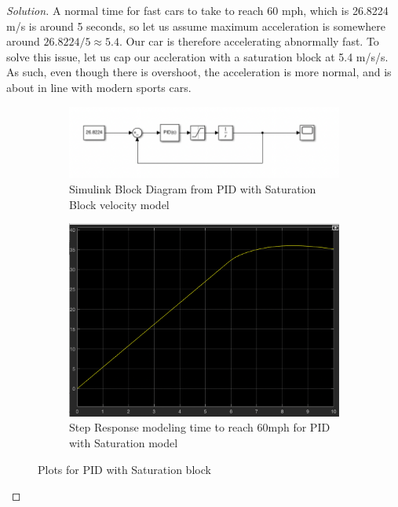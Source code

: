 \documentclass{article}
\begin{document}
\begin{proof}[Solution]
A normal time for fast cars to take to reach 60 mph, which is 26.8224 m/s is around 5 seconds, so let us assume maximum acceleration is somewhere around $26.8224/5 \approx 5.4$.
Our car is therefore accelerating abnormally fast. To solve this issue, let us cap our accleration with a saturation block at 5.4 m/s/s.
As such, even though there is overshoot, the acceleration is more normal, and is about in line with modern sports cars.

  \begin{figure}[h!]
    \centering
    \begin{subfigure}{0.4\linewidth}
      \includegraphics[width=\linewidth]{q3goodmodel.png}
      \caption{Simulink Block Diagram from PID with Saturation Block velocity model}
    \end{subfigure}
    \begin{subfigure}{0.4\linewidth}
      \includegraphics[width=\linewidth]{img13.png}
      \caption{Step Response modeling time to reach 60mph for PID with Saturation model}
    \end{subfigure}
    \caption{Plots for PID with Saturation block}
  \end{figure}

  
\end{proof}
\end{document}
